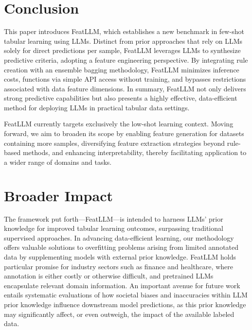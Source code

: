 \section{Conclusion}
This paper introduces \textsf{FeatLLM}, which establishes a new benchmark in few-shot tabular learning using LLMs. Distinct from prior approaches that rely on LLMs solely for direct predictions per sample, \textsf{FeatLLM} leverages LLMs to synthesize predictive criteria, adopting a feature engineering perspective. By integrating rule creation with an ensemble bagging methodology, \textsf{FeatLLM} minimizes inference costs, functions via simple API access without training, and bypasses restrictions associated with data feature dimensions. In summary, \textsf{FeatLLM} not only delivers strong predictive capabilities but also presents a highly effective, data-efficient method for deploying LLMs in practical tabular data settings.

\textsf{FeatLLM} currently targets exclusively the low-shot learning context. Moving forward, we aim to broaden its scope by enabling feature generation for datasets containing more samples, diversifying feature extraction strategies beyond rule-based methods, and enhancing interpretability, thereby facilitating application to a wider range of domains and tasks.

\section{Broader Impact}
The framework put forth—\textsf{FeatLLM}—is intended to harness LLMs’ prior knowledge for improved tabular learning outcomes, surpassing traditional supervised approaches. In advancing data-efficient learning, our methodology offers valuable solutions to overfitting problems arising from limited annotated data by supplementing models with external prior knowledge. \textsf{FeatLLM} holds particular promise for industry sectors such as finance and healthcare, where annotation is either costly or otherwise difficult, and pretrained LLMs encapsulate relevant domain information. An important avenue for future work entails systematic evaluations of how societal biases and inaccuracies within LLM prior knowledge influence downstream model predictions, as this prior knowledge may significantly affect, or even outweigh, the impact of the available labeled data.

